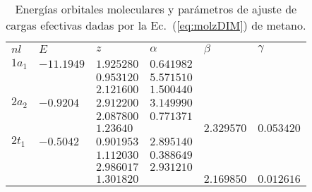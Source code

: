 \begin{table}[t]
\centering
\begin{tabular}{
>{\centering\arraybackslash}p{}
>{\centering\arraybackslash}p{}
>{\centering\arraybackslash}p{}
>{\centering\arraybackslash}p{}
>{\centering\arraybackslash}p{}
>{\centering\arraybackslash}p{}}
\rowcolor{mydarkgray} 
   $nl$ & $E$        & $z$        & $\alpha$   & $\beta$ & $\gamma$ \\
$1a_1$  & $-11.1949$ & $1.925280$ & $0.641982$ & & \\
\rowcolor{mygray} 
        &            & $0.953120$ & $5.571510$ & & \\
        &            & $2.121600$ & $1.500440$ & & \\
\rowcolor{mygray} 
$2a_2$  & $-0.9204$  & $2.912200$ & $3.149990$ & & \\
        &            & $2.087800$ & $0.771371$ & & \\
\rowcolor{mygray} 
        &            & $1.23640$  &            & $2.329570$ & $0.053420$ \\
$2t_1$  & $-0.5042$  & $0.901953$ & $2.895140$ & & \\
\rowcolor{mygray} 
        &            & $1.112030$ & $0.388649$ & & \\
        &            & $2.986017$ & $2.931210$ & & \\
\rowcolor{mygray} 
        &            & $1.301820$ &            & $2.169850$ & $0.012616$ \\ 
\end{tabular}
\caption[Energías y parámetros de ajuste de cargas efectivas de metano.]
{Energías orbitales moleculares y parámetros de ajuste de cargas efectivas dadas por la Ec.~(\ref{eq:molzDIM}) de metano.}
\label{tab:ch4parameters}
\end{table}



